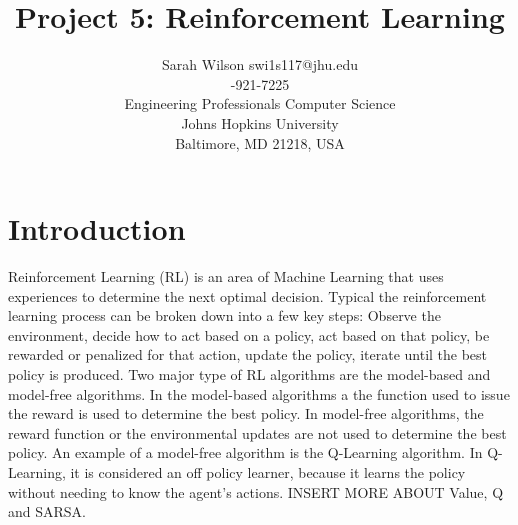 \documentclass[twoside,11pt]{article}
\begin{document}
\title{Project 5: Reinforcement Learning}

\author{\name Sarah Wilson 
	   \email swi1s117@jhu.edu \\
	   -921-7225 \\
       \addr Engineering Professionals Computer Science\\
       Johns Hopkins University\\
       Baltimore, MD 21218, USA} 

\maketitle


\section{Introduction}
\hspace*{10mm} Reinforcement Learning (RL) is an area of Machine Learning that uses experiences to determine the next optimal decision. Typical the reinforcement learning process can be broken down into a few key steps: Observe the environment, decide how to act based on a policy, act based on that policy, be rewarded or penalized for that action, update the policy, iterate until the best policy is produced. Two major type of RL algorithms are the model-based and model-free algorithms. In the model-based algorithms a the function used to issue the reward is used to determine the best policy. In model-free algorithms, the reward function or the environmental updates are not used to determine the best policy. An example of a model-free algorithm is the Q-Learning algorithm. In Q-Learning, it is considered an off policy learner, because it learns the policy without needing to know the agent's actions. INSERT MORE ABOUT Value, Q and SARSA. \\
\end{document}
